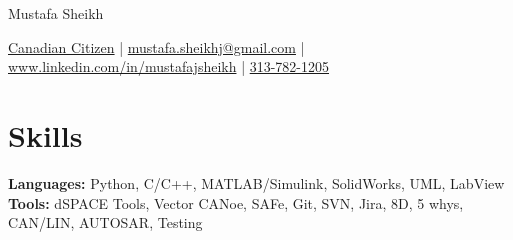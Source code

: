 \documentclass[11pt]{article}       %
\begin{document}
\centerline{\Huge Mustafa Sheikh}

\vspace{5pt}

\centerline{\href{}{Canadian Citizen} | \href{mailto:mustafa.sheikhj@gmail.com}{mustafa.sheikhj@gmail.com} | \href{wwww.linkedin.com/in/mustafajsheikh}{www.linkedin.com/in/mustafajsheikh} | \href{}{313-782-1205}}

\vspace{-10pt}

\section*{Skills}
\textbf{Languages:} Python, C/C++, MATLAB/Simulink, SolidWorks, UML, LabView \\
\textbf{Tools:} dSPACE Tools, Vector CANoe, SAFe, Git, SVN, Jira, 8D, 5 whys, CAN/LIN, AUTOSAR, Testing \\
\vspace{-6.5pt}

\end{document}
